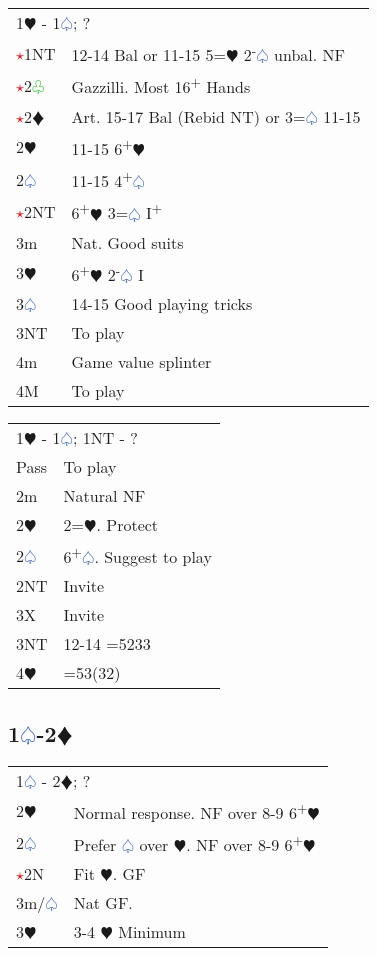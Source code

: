 \documentclass{article}
\renewcommand{\sp}{\textcolor{RoyalBlue}{$\varspade$}}
\newcommand{\he}{\textcolor{RubineRed}{$\varheart$}}
\newcommand{\di}{\textcolor{Peach}{$\vardiamond$}}
\newcommand{\cl}{\textcolor{LimeGreen}{$\varclub$}}
\newcommand{\nt}{\relsize{-1}NT\relsize{1}}
\newcommand{\up}{\textsuperscript{+}}
\newcommand{\down}{\textsuperscript{-}}
\newcommand{\al}{\textcolor{red}{$\star$}}
\begin{document}
\begin{tabular}{|l|p{6.5cm}}
	\multicolumn{2}{l}{1\he{} - 1\sp{}; ?} \\
	\al{}1\nt{} & 12-14 Bal or 11-15 5=\he{} 2\down{}\sp{} unbal. NF \\
	\al{}2\cl{} & Gazzilli. Most 16\up{} Hands \\
	\al{}2\di{} & Art. 15-17 Bal (Rebid \nt{}) or 3=\sp{} 11-15 \\
	2\he{} & 11-15 6\up\he{}\\
	2\sp{} & 11-15 4\up\sp{} \\
	\al{}2\nt{} & 6\up{}\he{} 3=\sp{} I\up{} \\
	3m & Nat. Good suits \\
	3\he{} & 6\up{}\he{} 2\down{}\sp{} I \\
	3\sp{} & 14-15 Good playing tricks \\
	3\nt{} & To play \\
	4m & Game value splinter \\
	4M & To play \\
\end{tabular}

\medskip

\begin{tabular}{|l|p{6.5cm}}
	\multicolumn{2}{l}{1\he{} - 1\sp{}; 1\nt{} - ?} \\
		Pass & To play \\
		2m & Natural NF \\
		2\he{} & 2=\he{}. Protect \\
		2\sp{} & 6\up{}\sp{}. Suggest to play \\
		2\nt{} & Invite \\
		3X & Invite \\
		3\nt{} & 12-14 =5233 \\
		4\he{} & =53(32) \\
\end{tabular}

\subsection{1\sp{}-2\di{}}

\begin{tabular}{|l|p{6.5cm}}
	\multicolumn{2}{l}{1\sp{} - 2\di{}; ? }\\
	2\he{} & Normal response. NF over 8-9 6\up{}\he{} \\
	2\sp{} & Prefer \sp{} over \he{}. NF over 8-9 6\up{}\he{} \\
	\al{}2N & Fit \he{}. GF \\
	3m/\sp{} & Nat GF. \\
	3\he{} & 3-4 \he{} Minimum \\
\end{tabular}
\end{document}
